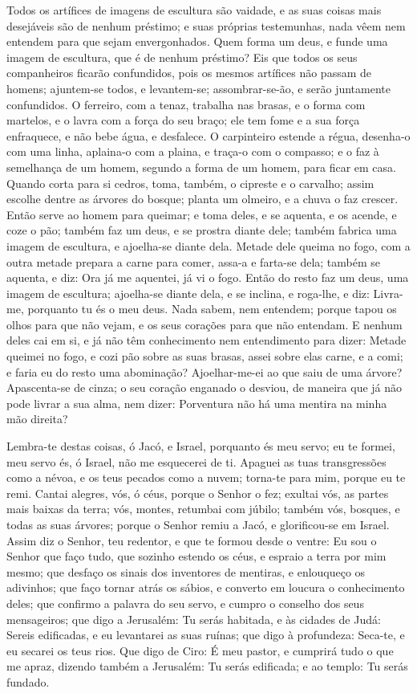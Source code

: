 Todos os artífices de imagens de escultura são vaidade, e as suas
coisas mais desejáveis são de nenhum préstimo; e suas próprias
testemunhas, nada vêem nem entendem para que sejam envergonhados.
Quem forma um deus, e funde uma imagem de escultura, que é de
nenhum préstimo? Eis que todos os seus companheiros ficarão
confundidos, pois os mesmos artífices não passam de homens;
ajuntem-se todos, e levantem-se; assombrar-se-ão, e serão juntamente
confundidos. O ferreiro, com a tenaz, trabalha nas brasas, e
o forma com martelos, e o lavra com a força do seu braço; ele tem
fome e a sua força enfraquece, e não bebe água, e desfalece.
O carpinteiro estende a régua, desenha-o com uma linha,
aplaina-o com a plaina, e traça-o com o compasso; e o faz à
semelhança de um homem, segundo a forma de um homem, para ficar em
casa. Quando corta para si cedros, toma, também, o cipreste e
o carvalho; assim escolhe dentre as árvores do bosque; planta um
olmeiro, e a chuva o faz crescer. Então serve ao homem para
queimar; e toma deles, e se aquenta, e os acende, e coze o pão;
também faz um deus, e se prostra diante dele; também fabrica uma
imagem de escultura, e ajoelha-se diante dela. Metade dele
queima no fogo, com a outra metade prepara a carne para comer,
assa-a e farta-se dela; também se aquenta, e diz: Ora já me
aquentei, já vi o fogo. Então do resto faz um deus, uma
imagem de escultura; ajoelha-se diante dela, e se inclina, e
roga-lhe, e diz: Livra-me, porquanto tu és o meu deus. Nada
sabem, nem entendem; porque tapou os olhos para que não vejam, e os
seus corações para que não entendam. E nenhum deles cai em
si, e já não têm conhecimento nem entendimento para dizer: Metade
queimei no fogo, e cozi pão sobre as suas brasas, assei sobre elas
carne, e a comi; e faria eu do resto uma abominação? Ajoelhar-me-ei
ao que saiu de uma árvore? Apascenta-se de cinza; o seu
coração enganado o desviou, de maneira que já não pode livrar a sua
alma, nem dizer: Porventura não há uma mentira na minha mão direita?

Lembra-te destas coisas, ó Jacó, e Israel, porquanto és meu
servo; eu te formei, meu servo és, ó Israel, não me esquecerei de
ti. Apaguei as tuas transgressões como a névoa, e os teus
pecados como a nuvem; torna-te para mim, porque eu te remi.
Cantai alegres, vós, ó céus, porque o Senhor o fez; exultai
vós, as partes mais baixas da terra; vós, montes, retumbai com
júbilo; também vós, bosques, e todas as suas árvores; porque o
Senhor remiu a Jacó, e glorificou-se em Israel. Assim diz o
Senhor, teu redentor, e que te formou desde o ventre: Eu sou o
Senhor que faço tudo, que sozinho estendo os céus, e espraio a terra
por mim mesmo; que desfaço os sinais dos inventores de
mentiras, e enlouqueço os adivinhos; que faço tornar atrás os
sábios, e converto em loucura o conhecimento deles; que
confirmo a palavra do seu servo, e cumpro o conselho dos seus
mensageiros; que digo a Jerusalém: Tu serás habitada, e às cidades
de Judá: Sereis edificadas, e eu levantarei as suas ruínas;
que digo à profundeza: Seca-te, e eu secarei os teus rios.
Que digo de Ciro: É meu pastor, e cumprirá tudo o que me
apraz, dizendo também a Jerusalém: Tu serás edificada; e ao templo:
Tu serás fundado.

